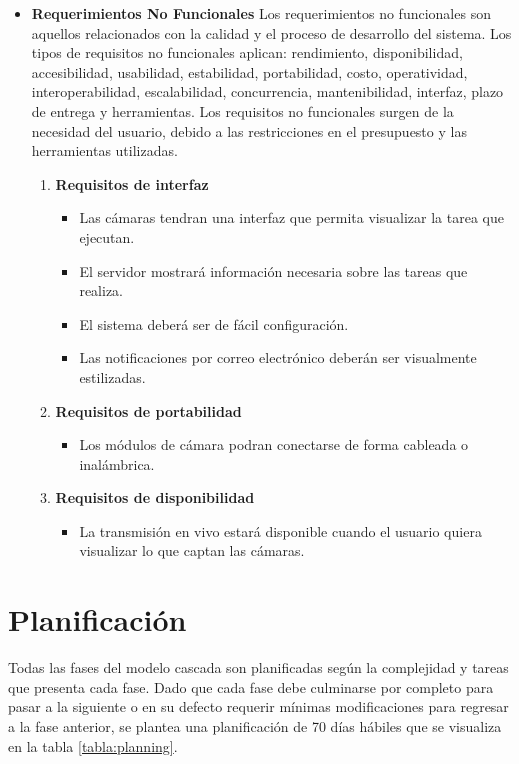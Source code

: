 \begin{itemize}
    \item \textbf{Requerimientos No Funcionales}
    Los requerimientos no funcionales son aquellos relacionados con la calidad y el proceso de desarrollo del sistema. Los tipos de requisitos no funcionales aplican: rendimiento, disponibilidad, accesibilidad, usabilidad, estabilidad, portabilidad, costo, operatividad, interoperabilidad, escalabilidad, concurrencia, mantenibilidad, interfaz, plazo de entrega y herramientas. Los requisitos no funcionales surgen de la necesidad del usuario, debido a las restricciones en el presupuesto y las herramientas utilizadas.\\
    
    \begin{enumerate}
        \item  \textbf{Requisitos de interfaz} 
            \begin{itemize}
                \item Las cámaras tendran una interfaz que permita visualizar la tarea que ejecutan.
                \item El servidor mostrará información necesaria sobre las tareas que realiza.
                \item El sistema deberá ser de fácil configuración.
                \item Las notificaciones por correo electrónico deberán ser visualmente estilizadas.
            \end{itemize}
        \item \textbf{Requisitos de portabilidad}
            \begin{itemize}
                \item Los módulos de cámara podran conectarse de forma cableada o inalámbrica.
            \end{itemize}
        \item \textbf{Requisitos de disponibilidad}
            \begin{itemize}
                \item La transmisión en vivo estará disponible cuando el usuario quiera visualizar lo que captan las cámaras.
            \end{itemize}
    \end{enumerate}

\end{itemize}

\section{Planificación}
Todas las fases del modelo cascada son planificadas según la complejidad y tareas que presenta cada fase. Dado que cada fase debe culminarse por completo para pasar a la siguiente o en su defecto requerir mínimas modificaciones para regresar a la fase anterior, se plantea una planificación de 70 días hábiles que se visualiza en la tabla \ref{tabla:planning}.\\

